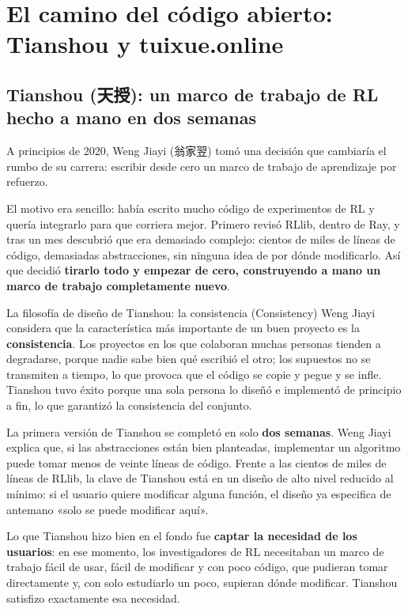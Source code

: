 \section{El camino del código abierto: Tianshou y tuixue.online}

\subsection{Tianshou (天授): un marco de trabajo de RL hecho a mano en dos semanas}

A principios de 2020, Weng Jiayi (翁家翌) tomó una decisión que cambiaría el rumbo de su carrera: escribir desde cero un marco de trabajo de aprendizaje por refuerzo.

El motivo era sencillo: había escrito mucho código de experimentos de RL y quería integrarlo para que corriera mejor. Primero revisó RLlib, dentro de Ray, y tras un mes descubrió que era demasiado complejo: cientos de miles de líneas de código, demasiadas abstracciones, sin ninguna idea de por dónde modificarlo. Así que decidió \textbf{tirarlo todo y empezar de cero, construyendo a mano un marco de trabajo completamente nuevo}.

\begin{importantbox}{La filosofía de diseño de Tianshou: la consistencia (Consistency)}
Weng Jiayi considera que la característica más importante de un buen proyecto es la \textbf{consistencia}. Los proyectos en los que colaboran muchas personas tienden a degradarse, porque nadie sabe bien qué escribió el otro; los supuestos no se transmiten a tiempo, lo que provoca que el código se copie y pegue y se infle. Tianshou tuvo éxito porque una sola persona lo diseñó e implementó de principio a fin, lo que garantizó la consistencia del conjunto.
\end{importantbox}

La primera versión de Tianshou se completó en solo \textbf{dos semanas}. Weng Jiayi explica que, si las abstracciones están bien planteadas, implementar un algoritmo puede tomar menos de veinte líneas de código. Frente a las cientos de miles de líneas de RLlib, la clave de Tianshou está en un diseño de alto nivel reducido al mínimo: si el usuario quiere modificar alguna función, el diseño ya especifica de antemano «solo se puede modificar aquí».

Lo que Tianshou hizo bien en el fondo fue \textbf{captar la necesidad de los usuarios}: en ese momento, los investigadores de RL necesitaban un marco de trabajo fácil de usar, fácil de modificar y con poco código, que pudieran tomar directamente y, con solo estudiarlo un poco, supieran dónde modificar. Tianshou satisfizo exactamente esa necesidad.

